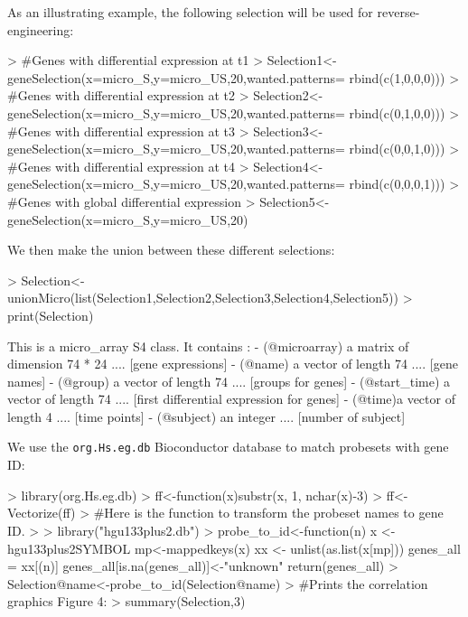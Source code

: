 \documentclass[a4paper]{article}
\begin{document}
As an illustrating example, the following selection will be used for reverse-engineering:

\begin{Schunk}
\begin{Sinput}
> #Genes with differential expression at t1
> Selection1<-geneSelection(x=micro_S,y=micro_US,20,wanted.patterns= rbind(c(1,0,0,0)))
> #Genes with differential expression at t2
> Selection2<-geneSelection(x=micro_S,y=micro_US,20,wanted.patterns= rbind(c(0,1,0,0)))
> #Genes with differential expression at t3
> Selection3<-geneSelection(x=micro_S,y=micro_US,20,wanted.patterns= rbind(c(0,0,1,0)))
> #Genes with differential expression at t4
> Selection4<-geneSelection(x=micro_S,y=micro_US,20,wanted.patterns= rbind(c(0,0,0,1)))
> #Genes with global differential expression 
> Selection5<-geneSelection(x=micro_S,y=micro_US,20)
\end{Sinput}
\end{Schunk}

We then make the union between these different selections:

\begin{Schunk}
\begin{Sinput}
> Selection<-unionMicro(list(Selection1,Selection2,Selection3,Selection4,Selection5))
> print(Selection)
\end{Sinput}
\begin{Soutput}
This is a micro_array S4 class. It contains : 
 - (@microarray) a matrix of dimension  74 * 24 
          .... [gene expressions] 
 - (@name) a vector of length  74  .... [gene names] 
 - (@group) a vector of length  74  .... [groups for genes] 
 - (@start_time) a vector of length  74 
          .... [first differential expression for genes] 
 - (@time)a vector of length  4  .... [time points]
 - (@subject) an integer  .... [number of subject]
\end{Soutput}
\end{Schunk}

We use the \texttt{org.Hs.eg.db} Bioconductor database to match probesets with gene ID:


\begin{Schunk}
\begin{Sinput}
> library(org.Hs.eg.db)
> ff<-function(x){substr(x, 1, nchar(x)-3)}
> ff<-Vectorize(ff)
> #Here is the function to transform the probeset names to gene ID.
> 
> library("hgu133plus2.db")
> probe_to_id<-function(n){  
   x <- hgu133plus2SYMBOL
   mp<-mappedkeys(x)
   xx <- unlist(as.list(x[mp]))
   genes_all = xx[(n)]
   genes_all[is.na(genes_all)]<-"unknown"
   return(genes_all)
   }
> Selection@name<-probe_to_id(Selection@name)
> #Prints the correlation graphics Figure 4:
> summary(Selection,3)
\end{Sinput}
\end{Schunk}
\end{document}
